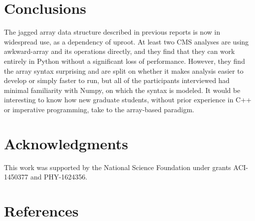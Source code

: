 \documentclass[a4paper]{jpconf}
\begin{document}
\section{Conclusions}

The jagged array data structure described in previous reports is now in widespread use, as a dependency of uproot. At least two CMS analyses are using awkward-array and its operations directly, and they find that they can work entirely in Python without a significant loss of performance. However, they find the array syntax surprising and are split on whether it makes analysis easier to develop or simply faster to run, but all of the participants interviewed had minimal familiarity with Numpy, on which the syntax is modeled. It would be interesting to know how new graduate students, without prior experience in C++ or imperative programming, take to the array-based paradigm.

\section{Acknowledgments}

This work was supported by the National Science Foundation under grants ACI-1450377 and PHY-1624356.

\section*{References}
{}

\end{document}
